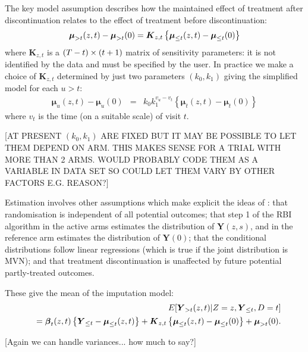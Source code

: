 The key model assumption describes how the maintained effect of treatment after
discontinuation relates to the effect of treatment before discontinuation:
\begin{equation}\label{eq:del}
\boldsymbol{\mu}_{{>t}}(z,t)-\boldsymbol{\mu}_{{>t}}(0) =
\boldsymbol{K}_{z,t} \left\{\boldsymbol{\mu}_{{\le{t}}}(z,t)-\boldsymbol{\mu}_{{\le{t}}}(0)\right\}
\end{equation}
where $\boldsymbol{K}_{z,t}$ is a $(T - t) \times (t+1)$ matrix of sensitivity parameters: it is not
identified by the data and must be specified by the user.
In practice we make a choice of $\boldsymbol{K}_{z,t}$ determined by just two parameters $(k_0,k_1)$ giving the simplified model for each $u>t$:
\begin{eqnarray}
\boldsymbol{\mu}_u(z,t) - \boldsymbol{\mu}_u(0)  & =& k_0 k_1^{v_u-v_t} \left\{ \boldsymbol{\mu}_t(z,t) - \boldsymbol{\mu}_t(0) \right\} \label{eq:mte3}
\end{eqnarray}
where  $v_t$ is the time (on a suitable scale) of visit $t$.

[AT PRESENT $(k_0, k_1)$ ARE FIXED BUT IT MAY BE POSSIBLE TO LET THEM DEPEND ON ARM. THIS MAKES SENSE FOR A TRIAL WITH MORE THAN 2 ARMS. WOULD PROBABLY CODE THEM AS A VARIABLE IN DATA SET SO COULD LET THEM VARY BY OTHER FACTORS E.G. REASON?]

Estimation involves other assumptions which make explicit the ideas of \citet{Carpenter++13}: 
that randomisation is independent of all potential outcomes; 
that step 1 of the RBI algorithm in the active arms estimates the distribution of $\boldsymbol{Y}(z,s)$,
and in the reference arm estimates the distribution of $\boldsymbol{Y}(0)$; 
that the conditional distributions follow linear regressions (which is true if the joint distribution is MVN); 
and that treatment discontinuation is unaffected by future potential partly-treated outcomes.

These give the mean of the imputation model:
\begin{eqnarray}\label{eq:causal}
&&E[\boldsymbol{Y}_{{>t}}(z,t) | Z=z, \boldsymbol{Y}_{{\le{t}}}, D=t]
\nonumber\\
&&=
\boldsymbol{\beta}_{t}(z,t) \left\{\boldsymbol{Y}_{{\le{t}}} - \boldsymbol{\mu}_{{\le{t}}}(z,t)\right\}  +
\boldsymbol{K}_{z,t} \left\{\boldsymbol{\mu}_{{\le{t}}}(z,t)-\boldsymbol{\mu}_{{\le{t}}}(0)\right\} +
\boldsymbol{\mu}_{{>t}}(0).
\end{eqnarray}

[Again we can handle variances... how much to say?]


